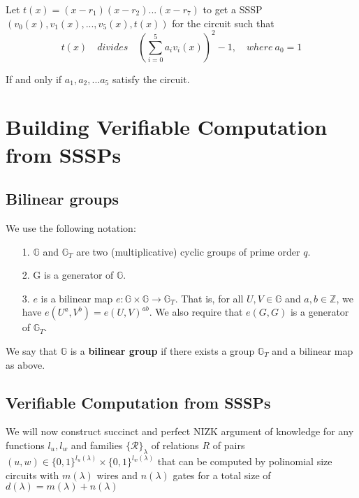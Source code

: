 \documentclass[lnbip]{svmultln}
\begin{document}
Let $t(x)=(x-r_1)(x-r_2)...(x-r_7)$ to get a SSSP $(v_0(x),v_1(x),...,v_5(x),t(x))$ for the circuit such that
$$t(x)\quad divides\quad \left(\sum\limits_{i=0}^5a_i v_i(x)\right)^2-1, \quad where ~ a_0=1$$

If and only if $a_1,a_2,...a_5$ satisfy the circuit.


\section{Building Verifiable Computation from SSSPs}


\subsection{Bilinear groups}
We use the following notation\cite{boneh2005evaluating}:
\begin{itemize}
	\item[1.] $\mathbb{G}$ and $\mathbb{G}_T$ are two (multiplicative) cyclic groups of prime order $q$.
	\item[2.] G is a generator of $\mathbb{G}$.
	\item[3.] $e$ is a bilinear map $e:\mathbb{G} \times \mathbb{G} \rightarrow \mathbb{G}_T$. That is, for all $U,V \in \mathbb{G}$ and $a,b \in \mathbb{Z}$, we have $e(U^a,V^b)=e(U,V)^{ab}.$ We also require that $e(G,G)$ is a generator of $\mathbb{G}_T$.
\end{itemize}

We say that $\mathbb{G}$ is a \textbf{bilinear group} if there exists a group $\mathbb{G}_T$ and a bilinear
map as above.

\subsection{Verifiable Computation from SSSPs}
We will now construct succinct and perfect NIZK argument of knowledge for any functions $l_u, l_w$ and families $\{\mathcal{R}\}_\lambda$ of relations $R$ of pairs $(u,w) \in \{0,1\}^{l_u(\lambda)} \times \{0,1\}^{l_w(\lambda)} $ that can be computed by polinomial size circuits with $m(\lambda)$ wires and $n(\lambda)$ gates for a total size of $d(\lambda)=m(\lambda)+n(\lambda)$ \\
\end{document}

